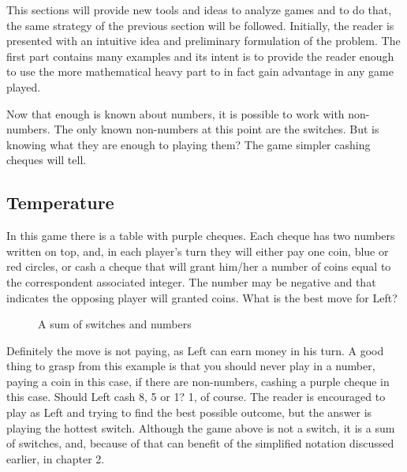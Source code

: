 
This sections will provide new tools and ideas to analyze games and to do that, the same strategy of the previous section will be followed. Initially, the reader is presented with an intuitive idea and preliminary formulation of the problem. The first part contains many examples and its intent is to provide the reader enough to use the more mathematical heavy part to in fact gain advantage in any game played.

Now that enough is known about numbers, it is possible to work with non-numbers. The only known non-numbers at this point are the switches. But is knowing what they are enough to playing them? The game simpler cashing cheques will tell.

\subsection*{Temperature}

In this game there is a table with purple cheques. Each cheque has two numbers written on top, and, in each player's turn they will either pay one coin, blue or red circles, or cash a cheque that will grant him/her a number of coins equal to the correspondent associated integer. The number may be negative and that indicates the opposing player will granted coins. What is the best move for Left?

\begin{figure}[H]
\begin{center}
\end{center}
\caption{A sum of switches and numbers}
\end{figure}

Definitely the move is not paying, as Left can earn money in his turn. A good thing to grasp from this example is that you should never play in a number, paying a coin in this case, if there are non-numbers, cashing a purple cheque in this case. Should Left cash 8, 5 or 1? 1, of course. The reader is encouraged to play as Left and trying to find the best possible outcome, but the answer is playing the hottest switch. Although the game above is not a switch, it is a sum of switches, and, because of that can benefit of the simplified notation discussed earlier, in chapter 2.

